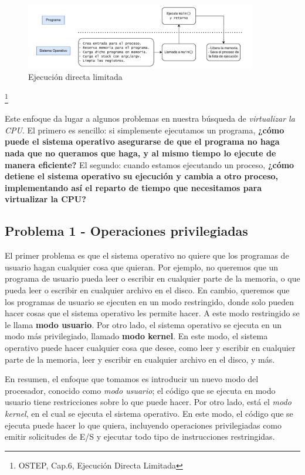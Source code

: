 \documentclass{article}
\begin{document}
\begin{figure}[h]
    \centering
    \includegraphics[width=0.9\textwidth]{src/edl.pdf}
    \caption{Ejecución directa limitada}
\end{figure} \footnote{OSTEP, Cap.6, Ejecución Directa Limitada}

Este enfoque da lugar a algunos problemas en nuestra búsqueda de \textit{virtualizar la CPU}. El primero es sencillo: si simplemente ejecutamos un programa, \textbf{¿cómo puede el sistema operativo asegurarse de que el programa no haga nada que no queramos que haga, y al mismo tiempo lo ejecute de manera eficiente?} El segundo: cuando estamos ejecutando un proceso, \textbf{¿cómo detiene el sistema operativo su ejecución y cambia a otro proceso, implementando así el reparto de tiempo que necesitamos para virtualizar la CPU?}

\subsection{Problema 1 - Operaciones privilegiadas}
El primer problema es que el sistema operativo no quiere que los programas de usuario hagan cualquier cosa que quieran. Por ejemplo, no queremos que un programa de usuario pueda leer o escribir en cualquier parte de la memoria, o que pueda leer o escribir en cualquier archivo en el disco. En cambio, queremos que los programas de usuario se ejecuten en un modo restringido, donde solo pueden hacer cosas que el sistema operativo les permite hacer. A este modo restringido se le llama \textbf{modo usuario}. Por otro lado, el sistema operativo se ejecuta en un modo más privilegiado, llamado \textbf{modo kernel}. En este modo, el sistema operativo puede hacer cualquier cosa que desee, como leer y escribir en cualquier parte de la memoria, leer y escribir en cualquier archivo en el disco, y más.

\begin{mdframed}[backgroundcolor=gray!10]
    En resumen, el enfoque que tomamos es introducir un nuevo modo del procesador, conocido como \textit{modo usuario}; el código que se ejecuta en modo usuario tiene restricciones sobre lo que puede hacer. Por otro lado, está el \textit{modo kernel}, en el cual se ejecuta el sistema operativo. En este modo, el código que se ejecuta puede hacer lo que quiera, incluyendo operaciones privilegiadas como emitir solicitudes de E/S y ejecutar todo tipo de instrucciones restringidas.
\end{mdframed}
\end{document}
